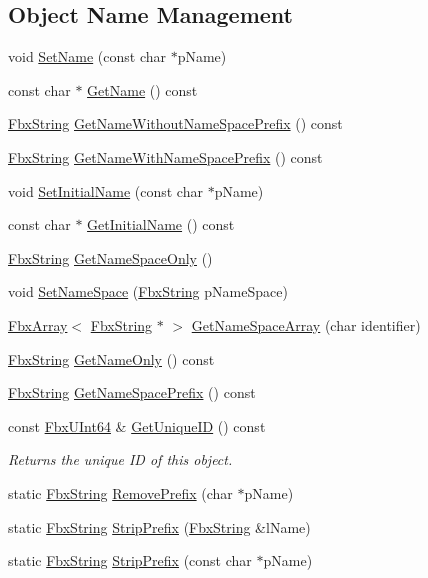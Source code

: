 \subsection*{Object Name Management}
\begin{DoxyCompactItemize}
\item 
void \hyperlink{class_fbx_object_aceea1c2fdb26784d668d05dd52df0d68}{Set\+Name} (const char $\ast$p\+Name)
\item 
const char $\ast$ \hyperlink{class_fbx_object_adb6c3656e49af96b64020991b5406ce2}{Get\+Name} () const
\item 
\hyperlink{class_fbx_string}{Fbx\+String} \hyperlink{class_fbx_object_ae378979d85476e931375e30b6498f8db}{Get\+Name\+Without\+Name\+Space\+Prefix} () const
\item 
\hyperlink{class_fbx_string}{Fbx\+String} \hyperlink{class_fbx_object_a9caa594f866ea3a424f5f6e3676e2799}{Get\+Name\+With\+Name\+Space\+Prefix} () const
\item 
void \hyperlink{class_fbx_object_a97b6469f5877e37d352b6f6224791fb2}{Set\+Initial\+Name} (const char $\ast$p\+Name)
\item 
const char $\ast$ \hyperlink{class_fbx_object_adb580039148c2dc765e5aa5cdf985627}{Get\+Initial\+Name} () const
\item 
\hyperlink{class_fbx_string}{Fbx\+String} \hyperlink{class_fbx_object_a9cc9873c1d66722b964c04da5ec2001f}{Get\+Name\+Space\+Only} ()
\item 
void \hyperlink{class_fbx_object_a0546604cdd763f630c9ffdf9cfcf8bdc}{Set\+Name\+Space} (\hyperlink{class_fbx_string}{Fbx\+String} p\+Name\+Space)
\item 
\hyperlink{class_fbx_array}{Fbx\+Array}$<$ \hyperlink{class_fbx_string}{Fbx\+String} $\ast$ $>$ \hyperlink{class_fbx_object_a2367b010ddd5ca21b37b5c7ddff0e781}{Get\+Name\+Space\+Array} (char identifier)
\item 
\hyperlink{class_fbx_string}{Fbx\+String} \hyperlink{class_fbx_object_a3a01a4d055e558d322016ce8d7337329}{Get\+Name\+Only} () const
\item 
\hyperlink{class_fbx_string}{Fbx\+String} \hyperlink{class_fbx_object_a8a0b08d810c3451ea912840caab53694}{Get\+Name\+Space\+Prefix} () const
\item 
const \hyperlink{fbxtypes_8h_a9beeca85cdc9941e912fe9eac7709b53}{Fbx\+U\+Int64} \& \hyperlink{class_fbx_object_a30e02c36e4adf5e42499c1f39ebfae08}{Get\+Unique\+ID} () const
\begin{DoxyCompactList}\small\item\em Returns the unique ID of this object. \end{DoxyCompactList}\item 
static \hyperlink{class_fbx_string}{Fbx\+String} \hyperlink{class_fbx_object_aa4a97de3c9d2d74d7b58f579ad3ad453}{Remove\+Prefix} (char $\ast$p\+Name)
\item 
static \hyperlink{class_fbx_string}{Fbx\+String} \hyperlink{class_fbx_object_aef0a016a9b53593f537b68ba47b8dd6e}{Strip\+Prefix} (\hyperlink{class_fbx_string}{Fbx\+String} \&l\+Name)
\item 
static \hyperlink{class_fbx_string}{Fbx\+String} \hyperlink{class_fbx_object_a23b53eecb8b6b7d198496392dc987548}{Strip\+Prefix} (const char $\ast$p\+Name)
\end{DoxyCompactItemize}
